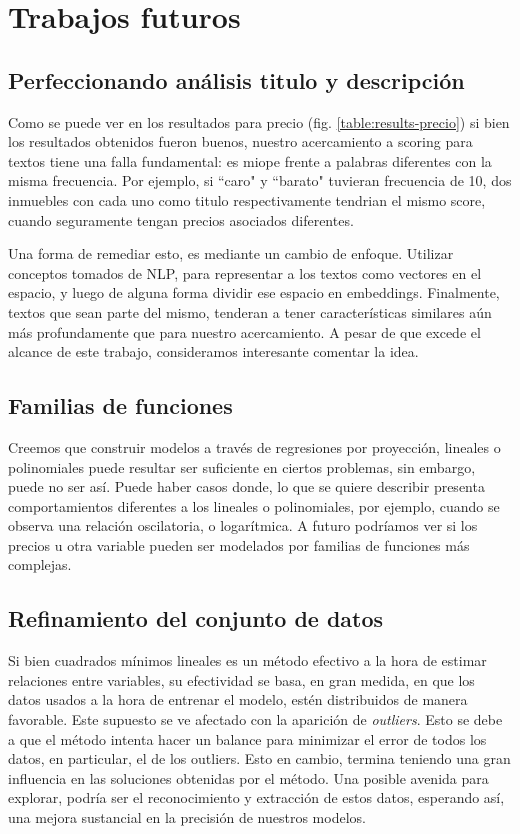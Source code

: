 \section{Trabajos futuros}

\subsection{Perfeccionando análisis titulo y descripción}

Como se puede ver en los resultados para precio (fig. \ref{table:results-precio}) si bien los resultados obtenidos fueron buenos, nuestro acercamiento a scoring para textos tiene una falla fundamental: es miope frente a palabras diferentes con la misma frecuencia. Por ejemplo, si ``caro" y ``barato" tuvieran frecuencia de 10, dos inmuebles con cada uno como titulo respectivamente tendrian el mismo score, cuando seguramente tengan precios asociados diferentes.

Una forma de remediar esto, es mediante un cambio de enfoque. Utilizar conceptos tomados de NLP, para representar a los textos como vectores en el espacio, y luego de alguna forma dividir ese espacio en embeddings. Finalmente, textos que sean parte del mismo, tenderan a tener características similares aún más profundamente que para nuestro acercamiento. A pesar de que excede el alcance de este trabajo, consideramos interesante comentar la idea.

\subsection{Familias de funciones}

Creemos que construir modelos a través de regresiones por proyección, lineales o polinomiales puede resultar ser suficiente en ciertos problemas, sin embargo, puede no ser así. Puede haber casos donde, lo que se quiere describir presenta comportamientos diferentes a los lineales o polinomiales, por ejemplo, cuando se observa una relación oscilatoria, o logarítmica. A futuro podríamos ver si los precios u otra variable pueden ser modelados por familias de funciones más complejas.

\subsection{Refinamiento del conjunto de datos}

Si bien cuadrados mínimos lineales es un método efectivo a la hora de estimar relaciones entre variables, su efectividad se basa, en gran medida, en que los datos usados a la hora de entrenar el modelo, estén distribuidos de manera favorable. Este supuesto se ve afectado con la aparición de \textit{outliers}. Esto se debe a que el método intenta hacer un balance para minimizar el error de todos los datos, en particular, el de los outliers. Esto en cambio, termina teniendo una gran influencia en las soluciones obtenidas por el método. Una posible avenida para explorar, podría ser el reconocimiento y extracción de estos datos, esperando así, una mejora sustancial en la precisión de nuestros modelos.

